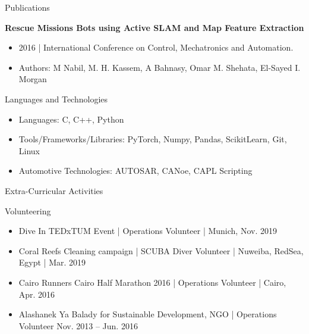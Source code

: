 \documentclass[]{mcdowellcv}
\begin{document}
	\begin{cvsection}{Publications}
		\begin{cvsubsection}{}{}{}
			\textbf{Rescue Missions Bots using Active SLAM and Map Feature Extraction}
			\begin{itemize}
				\item 2016 | International Conference on Control, Mechatronics and Automation.
				\item Authors: M Nabil,  M. H. Kassem, A Bahnasy, Omar M. Shehata, El-Sayed I. Morgan
			\end{itemize}
		\end{cvsubsection}
	\end{cvsection}
	
	\begin{cvsection}{Languages and Technologies}
		\begin{cvsubsection}{}{}{}	
			\begin{itemize}
				\item Languages: C, C++, Python
				\item Tools/Frameworks/Libraries: PyTorch, Numpy, Pandas, ScikitLearn, Git, Linux
				\item Automotive Technologies: AUTOSAR, CANoe, CAPL Scripting
			\end{itemize}
		\end{cvsubsection}
	\end{cvsection}
	
	\begin{cvsection}{Extra-Curricular Activities}
		\begin{cvsubsection}{Volunteering}{}{}	
			
			\begin{itemize}
				\item Dive In TEDxTUM Event | Operations Volunteer | Munich, Nov. 2019
				\item Coral Reefs Cleaning campaign | SCUBA Diver Volunteer | Nuweiba, RedSea, Egypt | Mar. 2019
				\item Cairo Runners Cairo Half Marathon 2016 | Operations Volunteer | Cairo, Apr. 2016
				\item Alashanek Ya Balady for Sustainable Development, NGO | Operations Volunteer  Nov. 2013 -- Jun. 2016
			\end{itemize}
		\end{cvsubsection}
	\end{cvsection}
	
	
\end{document}
